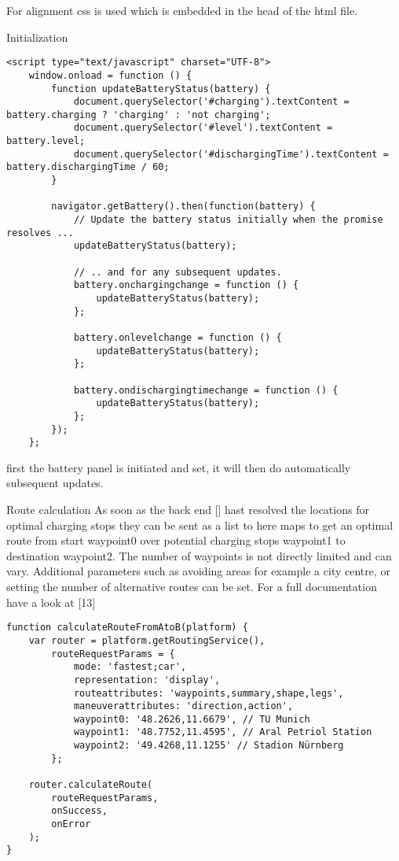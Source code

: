 For alignment css is used which is embedded in the head of the html file.

Initialization

\begin{verbatim}
<script type="text/javascript" charset="UTF-8">
    window.onload = function () {
        function updateBatteryStatus(battery) {
            document.querySelector('#charging').textContent = battery.charging ? 'charging' : 'not charging';
            document.querySelector('#level').textContent = battery.level;
            document.querySelector('#dischargingTime').textContent = battery.dischargingTime / 60;
        }

        navigator.getBattery().then(function(battery) {
            // Update the battery status initially when the promise resolves ...
            updateBatteryStatus(battery);

            // .. and for any subsequent updates.
            battery.onchargingchange = function () {
                updateBatteryStatus(battery);
            };

            battery.onlevelchange = function () {
                updateBatteryStatus(battery);
            };

            battery.ondischargingtimechange = function () {
                updateBatteryStatus(battery);
            };
        });
    };
\end{verbatim}


first the battery panel is initiated and set, it will then do automatically subsequent updates. 



Route calculation
As soon as the back end [] hast resolved the locations for optimal charging stops they can be sent as a list to here maps to get an optimal route from start waypoint0 over potential charging stops waypoint1 to destination waypoint2. The number of waypoints is not directly limited and can vary. Additional parameters such as avoiding areas for example a city centre, or setting the number of alternative routes can be set. For a full documentation have a look at [13]

\begin{verbatim}
function calculateRouteFromAtoB(platform) {
    var router = platform.getRoutingService(),
        routeRequestParams = {
            mode: 'fastest;car',
            representation: 'display',
            routeattributes: 'waypoints,summary,shape,legs',
            maneuverattributes: 'direction,action',
            waypoint0: '48.2626,11.6679', // TU Munich
            waypoint1: '48.7752,11.4595', // Aral Petriol Station
            waypoint2: '49.4268,11.1255' // Stadion Nürnberg
        };

    router.calculateRoute(
        routeRequestParams,
        onSuccess,
        onError
    );
}
\end{verbatim}

